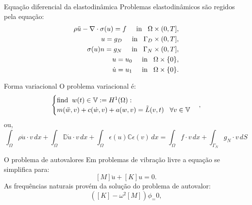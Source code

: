 \documentclass{beamer}
\begin{document}
\begin{frame}{Equação diferencial da elastodinâmica}
    \indent Problemas elastodinâmicos são regidos pela equação: $$\begin{aligned}
        \rho \ddot{u} - \nabla \cdot \sigma(u)  = f \hspace{0.5cm} \text{in} \hspace{3mm} \Omega \times (0,T],  \\
        u = g_D \hspace{0.5cm} \text{in} \hspace{3mm} \Gamma_D \times (0,T],\\
        \sigma (u) n = g_N \hspace{0.5cm} \text{in} \hspace{3mm} \Gamma_N \times (0,T],\\
        u = u_0 \hspace{0.5cm} \text{in} \hspace{3mm} \Omega \times \{0\},\\
        \dot{u} = u_1 \hspace{0.5cm} \text{in} \hspace{3mm} \Omega \times \{0\}.
    \end{aligned}$$
\end{frame}

\begin{frame}{Forma variacional }
    O problema variacional  é: $$\begin{cases} \text{find} \hspace{2mm} w(t) \in \mathbb{V} := H^1(\Omega): \\ m(\ddot{w},v) + c(\dot{w},v) + a(w,v) = \tilde{L}(v,t) \hspace{3mm} \forall v \in \mathbb{V} \end{cases},$$ ou,
    $$\int_\Omega \rho \ddot{u} \cdot v \, dx + \int_\Omega \mathbb{D} \dot{u} \cdot v \, dx + \int_\Omega \epsilon(u) \mathbb{C} \epsilon(v) \, dx = \int_\Omega f \cdot v \, dx + \int_{\Gamma_N} g_N \cdot v \, dS$$\pause
\end{frame}

\begin{frame}{O problema de autovalores}
    Em problemas de vibração livre a equação se simplifica para: $$[M] \ddot{u} + [K]u = 0.$$
    As frequências naturais provém da solução do problema de autovalor: $$\left([K]-\omega^2[M]\right)\phi_ = 0,$$
\end{frame}
\end{document}
